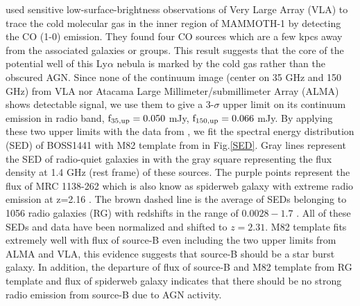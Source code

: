 \documentclass[../Results.tex]{subfiles}
\begin{document}
	\cite{emonts2019cold} used sensitive low-surface-brightness observations of Very Large Array (VLA) to trace the cold molecular gas in the inner region of MAMMOTH-1 by detecting the CO (1-0) emission. They found four CO sources which are a few kpcs away from the associated galaxies or groups. This result suggests that the core of the potential well of this Ly$\alpha$ nebula is marked by the cold gas rather than the obscured AGN. Since none of the continuum image (center on 35 GHz and 150 GHz) from VLA nor Atacama Large Millimeter/submillimeter Array (ALMA) shows detectable signal, we use them to give a 3-$\sigma$ upper limit on its continuum emission in radio band, $\rm f_{35,up}=0.050$ mJy, $\rm f_{150,up}=0.066$ mJy. By applying these two upper limits with the data from \citet{arrigoni2018overdensity}, we fit the spectral energy distribution (SED) of BOSS1441 with M82 template from \cite{Silva_1998} in Fig.\ref{SED}. Gray lines represent the SED of radio-quiet galaxies in \citet{harrison2014kiloparsec} with the gray square representing the flux density at 1.4 GHz (rest frame) of these sources. The purple points represent the flux of MRC 1138-262 which is also know as spiderweb galaxy with extreme radio emission at z=2.16 \citep{Nesvadba_2006}. The brown dashed line is the average of SEDs belonging to 1056 radio galaxies (RG) with redshifts in the range of $0.0028-1.7$ \citep{Toba_2019}. All of these SEDs and data have been normalized and shifted to $z=2.31$. M82 template fits extremely well with flux of source-B even including the two upper limits from ALMA and VLA, this evidence suggests that source-B should be a star burst galaxy. In addition, the departure of flux of source-B and M82 template from RG template and flux of spiderweb galaxy indicates that there should be no strong radio emission from source-B due to AGN activity.
	
\end{document}
